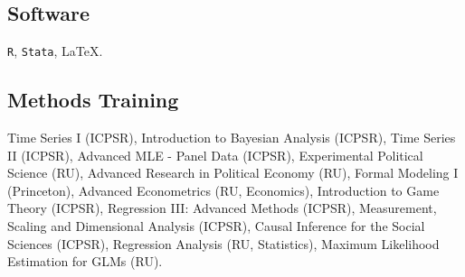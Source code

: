 \documentclass[letterpaper]{article}
\begin{document}
\subsection*{Software}
\texttt{R}, \texttt{Stata}, \LaTeX.

\subsection*{Methods Training}
Time Series I (ICPSR), Introduction to Bayesian Analysis (ICPSR), Time Series II (ICPSR), Advanced MLE - Panel Data (ICPSR), Experimental Political Science (RU), Advanced Research in Political Economy (RU), Formal Modeling I (Princeton), Advanced Econometrics (RU, Economics), Introduction to Game Theory (ICPSR), Regression III: Advanced Methods (ICPSR), Measurement, Scaling and Dimensional Analysis (ICPSR), Causal Inference for the Social Sciences (ICPSR), Regression Analysis (RU, Statistics), Maximum Likelihood Estimation for GLMs (RU).




\bigskip
\end{document}
